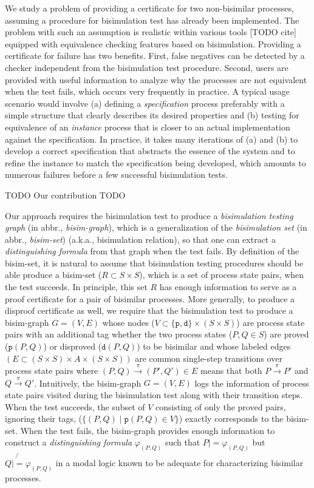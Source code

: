 \documentclass{llncs}
\begin{document}
We study a problem of providing a certificate for two non-bisimilar processes,
assuming a procedure for bisimulation test has already been implemented.
The problem with such an assumption is realistic within various tools [TODO cite]
equipped with equivalence checking features based on bisimulation.
Providing a certificate for failure has two benefits. First, false negatives
can be detected by a checker independent from the bisimulation test procedure.
Second, users are provided with useful information to analyze why
the processes are not equivalent when the test fails, which occurs very
frequently in practice. A typical usage scenario would involve
(a) defining a \emph{specification} process preferably with a simple structure
    that clearly describes its desired properties and
(b) testing for equivalence of an \emph{instance} process that is closer to
    an actual implementation against the specification.
In practice, it takes many iterations of (a) and (b) to develop a correct
specification that abstracts the essence of the system and to refine
the instance to match the specification being developed, which amounts to
numerous failures before a few successful bisimulation tests.

TODO Our contribution TODO

Our approach requires the bisimulation test to produce
a \emph{bisimulation testing graph} (in abbr., \emph{bisim-graph}),
which is a generalization of the \emph{bisimulation set}
(in abbr., \emph{bisim-set}) (a.k.a., bisimulation relation),
so that one can extract a \emph{distinguishing formula} from that graph
when the test fails.
By definition of the bisim-set, it is natural to assume that bisimulation
testing procedures should be able produce a bisim-set ($R \subset S\times S$),
which is a set of process state pairs, when the test succeeds.
In principle, this set $R$ has enough information to serve as a proof
certificate for a pair of bisimilar processes. More generally, to produce
a disproof certificate as well, we require that the bisimulation test
to produce a bisim-graph $G=(V,E)$ whose nodes
($V\subset\{\texttt{p},\texttt{d}\}\times(S\times S)$) are process state pairs
with an additional tag whether the two process states ($P, Q\in S$) are proved
($\texttt{p}(P,Q)$) or disproved ($\texttt{d}(P,Q)$) to be bisimilar and whose
labeled edges $(E\subset(S\times S)\times A\times(S\times S))$ are
common single-step transitions over process state pairs where
$(P,Q)\xrightarrow{\pi}(P',Q') \in E$ means that both $P\xrightarrow{\pi}P'$
and $Q\xrightarrow{\pi}Q'$. Intuitively, the bisim-graph $G=(V,E)$ logs
the information of process state pairs visited during the bisimulation test
along with their transition steps. When the test succeeds,
the subset of $V$ consisting of only the proved pairs, ignoring their tags,
($\{(P,Q) \mid \texttt{p}(P,Q)\in V\}$) exactly corresponds to the bisim-set.
When the test fails, the bisim-graph provides enough information to
construct a \emph{distinguishing formula} $\varphi_{(P,Q)}$ such that
$P |= \varphi_{(P,Q)}$ but $Q \not{|=} \varphi_{(P,Q)}$ in a modal logic
known to be adequate for characterizing bisimilar processes.
\end{document}
